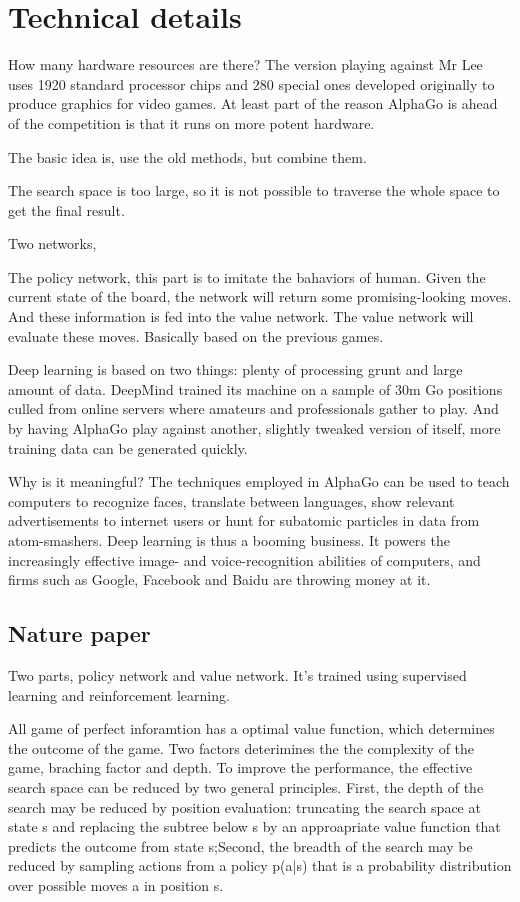 \section{Technical details}
How many hardware resources are there? The version playing against Mr Lee uses 1920 standard processor chips and 280 special ones developed originally to produce graphics for video games. At least part of the reason AlphaGo is ahead of the competition is that it runs on more potent hardware.

The basic idea is, use the old methods, but combine them. 

The search space is too large, so it is not possible to traverse the whole space to get the final result. 

Two networks, 

The policy network, this part is to imitate the bahaviors of human. Given the current state of the board, the network will return some promising-looking moves. And these information is fed into the value network. The value network will evaluate these moves. Basically based on the previous games.

Deep learning is based on two things: plenty of processing grunt and large amount of data. DeepMind trained its machine on a sample of 30m Go positions culled from online servers where amateurs and professionals gather to play. And by having AlphaGo play against another, slightly tweaked version of itself, more training data can be generated quickly.

Why is it meaningful? The techniques employed in AlphaGo can be used to teach computers to recognize faces, translate between languages, show relevant advertisements to internet users or hunt for subatomic particles in data from atom-smashers. Deep learning is thus a booming business. It powers the increasingly effective image- and voice-recognition abilities of computers, and firms such as Google, Facebook and Baidu are throwing money at it.

\subsection{Nature paper}
Two parts, policy network and value network. It's trained using supervised learning and reinforcement learning.

All game of perfect inforamtion has a optimal value function, which determines the outcome of the game. Two factors deterimines the the complexity of the game, braching factor and depth. To improve the performance, the effective search space can be reduced by two general principles. First, the depth of the search may be reduced by position evaluation: truncating the search space at state s and replacing the subtree below s by an approapriate value function that predicts the outcome from state s;Second, the breadth of the search may be reduced by sampling actions from a policy p(a|s) that is a probability distribution over possible moves a in position s.

